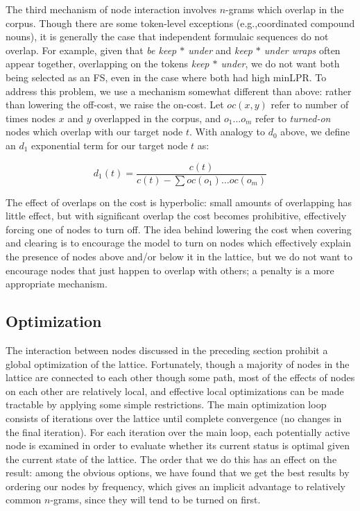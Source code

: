 \documentclass[11pt]{article}
\makeatletter
\def \eg {e.g.,\@ }
\newcommand{\dotts}{...}
\newcommand{\gap}{$*$\xspace}
\newcommand{\ex}[1]{\textit{#1}\xspace}
\newcommand{\termemph}[1]{\textit{#1}\xspace}
\makeatother
\begin{document}
The third mechanism of node interaction involves $n$-grams which overlap in the corpus. Though there are some token-level exceptions (\eg coordinated compound nouns), it is generally the case that independent formulaic sequences do not overlap. For example, given that \ex{be keep \gap under} and \ex{keep \gap under wraps} often appear together, overlapping on the tokens \ex{keep \gap under}, we do not want both being selected as an FS, even in the case where both had high minLPR. To address this problem, we use a mechanism somewhat different than above: rather than lowering the off-cost, we raise the on-cost. Let $oc(x,y)$ refer to number of times nodes $x$ and $y$ overlapped in the corpus, and $o_1\dotts o_m$ refer to \termemph{turned-on} nodes which overlap with our target node $t$. With analogy to $d_0$ above, we define an $d_1$ exponential term for our target node $t$ as:

\begin{displaymath}
d_{1}(t) = \frac{c(t)}{c(t) - \sum{oc(o_1)\ldots oc(o_m)}}
\end{displaymath}

The effect of overlaps on the cost is hyperbolic: small amounts of overlapping has little effect, but with significant overlap the cost becomes prohibitive, effectively forcing one of nodes to turn off. The idea behind lowering the cost when covering and clearing is to encourage the model to turn on nodes which effectively explain the presence of nodes above and/or below it in the lattice, but we do not want to encourage nodes that just happen to overlap with others; a penalty is a more appropriate mechanism.

 
\subsection{Optimization}

The interaction between nodes discussed in the preceding section prohibit a global optimization of the lattice. Fortunately, though a majority of nodes in the lattice are connected to each other though some path, most of the effects of nodes on each other are relatively local, and effective local optimizations can be made tractable by applying some simple restrictions. The main optimization loop consists of iterations over the lattice until complete convergence (no changes in the final iteration). For each iteration over the main loop, each potentially active node is examined in order to evaluate whether its current status is optimal given the current state of the lattice. The order that we do this has an effect on the result: among the obvious options, we have found that we get the best results by ordering our nodes by frequency, which gives an implicit advantage to relatively common $n$-grams, since they will tend to be turned on first.
\end{document}
